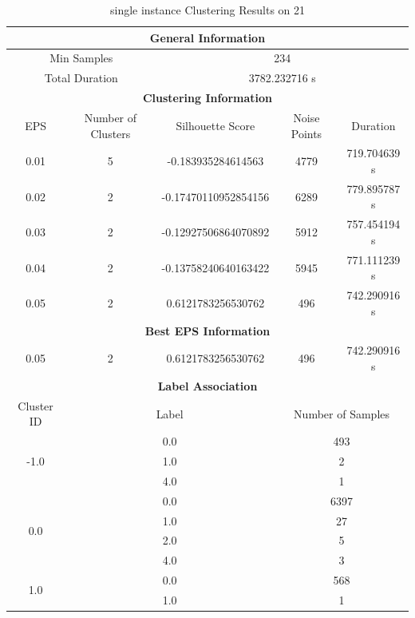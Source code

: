 \begin{longtable}{|c|c|c|c|c|}
\caption{single instance Clustering Results on 21} \label{tab:21_single_instance_clustering_results}\\
\hline
\multicolumn{5}{|c|}{\textbf{General Information}} \\
\hline
\multicolumn{2}{|c|}{Min Samples} & \multicolumn{3}{c|}{234} \\
\multicolumn{2}{|c|}{Total Duration} & \multicolumn{3}{c|}{3782.232716 s} \\
\hline
\multicolumn{5}{|c|}{\textbf{Clustering Information}} \\
\hline
EPS & Number of Clusters & Silhouette Score & Noise Points & Duration \\
0.01 & 5 & -0.183935284614563 & 4779 & 719.704639 s\\
0.02 & 2 & -0.17470110952854156 & 6289 & 779.895787 s\\
0.03 & 2 & -0.12927506864070892 & 5912 & 757.454194 s\\
0.04 & 2 & -0.13758240640163422 & 5945 & 771.111239 s\\
0.05 & 2 & 0.6121783256530762 & 496 & 742.290916 s\\
\hline
\multicolumn{5}{|c|}{\textbf{Best EPS Information}} \\
\hline
0.05 & 2 & 0.6121783256530762 & 496 & 742.290916 s\\
\hline
\multicolumn{5}{|c|}{\textbf{Label Association}} \\
\hline
Cluster ID & \multicolumn{2}{c|}{Label} & \multicolumn{2}{c|}{Number of Samples} \\
\hline
\multirow{3}{*}{-1.0} & \multicolumn{2}{c|}{0.0} & \multicolumn{2}{c|}{493} \\
& \multicolumn{2}{c|}{1.0} & \multicolumn{2}{c|}{2} \\
& \multicolumn{2}{c|}{4.0} & \multicolumn{2}{c|}{1} \\
\hline
\multirow{4}{*}{0.0} & \multicolumn{2}{c|}{0.0} & \multicolumn{2}{c|}{6397} \\
& \multicolumn{2}{c|}{1.0} & \multicolumn{2}{c|}{27} \\
& \multicolumn{2}{c|}{2.0} & \multicolumn{2}{c|}{5} \\
& \multicolumn{2}{c|}{4.0} & \multicolumn{2}{c|}{3} \\
\hline
\multirow{3}{*}{1.0} & \multicolumn{2}{c|}{0.0} & \multicolumn{2}{c|}{568} \\
& \multicolumn{2}{c|}{1.0} & \multicolumn{2}{c|}{1} \\

\end{longtable}
